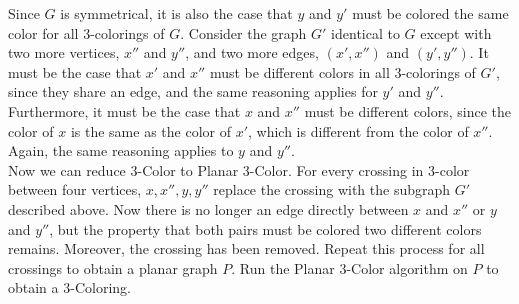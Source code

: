 \documentclass[letterpaper,notitlepage,twoside]{article}
\begin{document}

Since $G$ is symmetrical, it is also the case that $y$ and $y'$ must be colored the same color for all 3-colorings of $G$. Consider the graph $G'$ identical to $G$ except with two more vertices, $x''$ and $y''$, and two more edges, $(x', x'')$ and $(y', y'')$. It must be the case that $x'$ and $x''$ must be different colors in all 3-colorings of $G'$, since they share an edge, and the same reasoning applies for $y'$ and $y''$. Furthermore, it must be the case that $x$ and $x''$ must be different colors, since the color of $x$ is the same as the color of $x'$, which is different from the color of $x''$. Again, the same reasoning applies to $y$ and $y''$.
\\
Now we can reduce 3-Color to Planar 3-Color. For every crossing in 3-color between four vertices, $x, x'', y, y''$ replace the crossing with the subgraph $G'$ described above. Now there is no longer an edge directly between $x$ and $x''$ or $y$ and $y''$, but the property that both pairs must be colored two different colors remains. Moreover, the crossing has been removed. Repeat this process for all crossings to obtain a planar graph $P$. Run the Planar 3-Color algorithm on $P$ to obtain a 3-Coloring.
\end{document}
